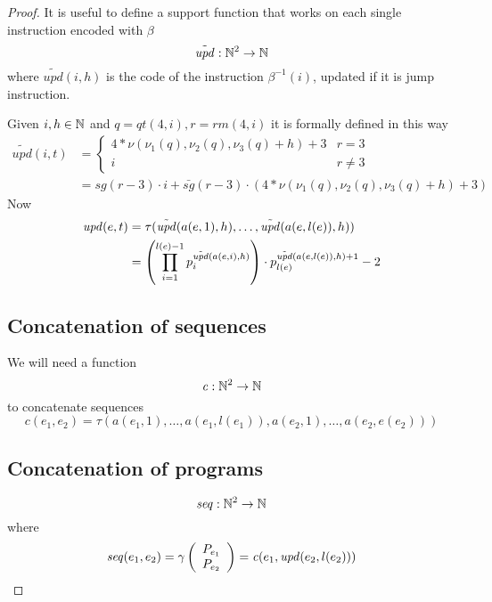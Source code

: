 \begin{theorem}
\begin{proof}
     It is useful to define a support function that works
      on each single instruction encoded with $\beta$
      \newcommand{\tup}[1]{\ensuremath{\tilde{\mathit{upd}}({#1})}}
      \[
        \tilde{\mathit{upd}} : \mathbb{N}^2 \rightarrow \mathbb{N}
      \]
      where $\tup{i, h}$ is the code of the instruction $\beta^{-1}(i)$,
       updated if it is jump instruction.

      \newcommand{\qt}[1]{\ensuremath{\mathit{qt}({#1})}}
      \newcommand{\rmf}[1]{\ensuremath{\mathit{rm}({#1})}}

      Given $i,h \in \mathbb{N}$ and $q=\qt{4,i}, r=\rmf{4,i}$ it is formally defined in this way
      \begin{align*}
        \tup{i,t} &= \begin{cases}
          4 * \nu(\nu_1(q), \nu_2(q), \nu_3(q) + h) + 3 & r=3 \\
          i & r \neq 3
        \end{cases} \\
        &= sg(r - 3) \cdot i + \bar{sg}(r - 3) \cdot (4 * \nu(\nu_1(q), \nu_2(q), \nu_3(q) + h) + 3)
      \end{align*}
      Now
      \begin{align*}
        \up{e,t} &= \tau(\tup{a(e,1), h}, \dots, \tup{a(e, l(e)), h}) \\
        &= \left(\prod^{l(e)-1}_{i=1}p_i^{\tup{a(e,i), h}}\right) \cdot p_{l(e)}^{\tup{a(e,l(e)), h} + 1}-2
      \end{align*}

\subsection*{Concatenation of sequences}
We will need a function
    \newcommand{\conc}[1]{\ensuremath{\mathit{c}({#1})}}
    \[
      \mathit{c}: \mathbb{N}^2 \rightarrow \mathbb{N}
    \]
    to concatenate sequences
    \[
        \conc{e_1, e_2} = \tau(a(e_1,1), \dots, a(e_1,l(e_1)),
        a(e_2,1), \dots, a(e_2, e(e_2)))
    \]
\subsection*{Concatenation of programs}
    \newcommand{\seq}[1]{\ensuremath{\mathit{seq}({#1})}}
    \[
      \mathit{seq} : \mathbb{N}^2 \rightarrow \mathbb{N}
    \]
where
    \[
      \seq{e_1, e_2} = \gamma \left( \begin{array}{c}
                                P_{e_1} \\
                                P_{e_2}
                              \end{array} \right)
                              = \conc{e_1, \up{e_2, l(e_2)}}
    \]


\end{proof}
\end{theorem}
